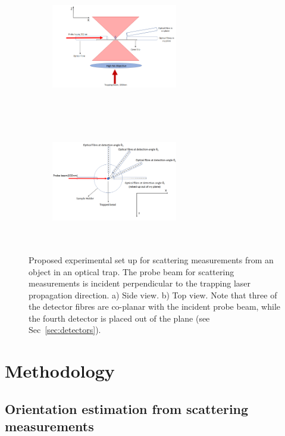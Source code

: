 \documentclass[12pt]{spieman}
\begin{document}
\begin{spacing}{1.5}
\begin{figure} [h]
\centering
\begin{subfigure}{0.45\textwidth}
	\includegraphics[width=5.5cm, height=5.5cm]{./Images/fig1a.png}
\end{subfigure}
\begin{subfigure}{0.45\textwidth}
	\includegraphics[width=5.5cm, height=5.5cm]{./Images/fig1b.png}
\end{subfigure}
\caption{\label{fig:setup}
  Proposed experimental set up for scattering measurements from an object in an optical trap. The probe beam for scattering measurements is incident perpendicular to the trapping laser propagation direction. a) Side view. b) Top view. Note that three of the detector fibres are co-planar with the incident probe beam, while the fourth detector is placed out of the plane (see Sec~\ref{sec:detectors}).
%
}
\end{figure}

\section{Methodology}
\label{sec:Method}
\subsection{Orientation estimation from scattering measurements}
\label{sec:Bayes}


\end{spacing}
\end{document}
